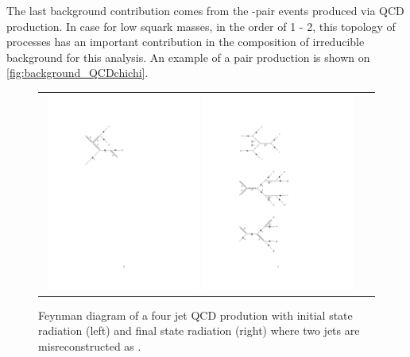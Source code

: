 The last background contribution comes from the \charginopm -\neutralinotwo pair events produced via QCD production. In case for low squark masses, in the order of 1 - 2\tev, this topology of processes has an important contribution in the composition of irreducible background for this analysis. An example of a \neutralinotwo pair production is shown on \autoref{fig:background_QCDchichi}.

\begin{figure}[tbh!]
	\centering
	\begin{tabular}{cc}
		\includegraphics[width=0.48\textwidth]{diagrams/pics/background_QCDinitrad.pdf}
		\includegraphics[width=0.48\textwidth]{diagrams/pics/background_QCDfinrad.pdf}
	\end{tabular}
	\caption{Feynman diagram of a four jet QCD prodution with initial state radiation (left) and final state radiation (right) where two jets are misreconstructed as \hadtau. }
	\label{fig:background_QCDinitrad}
\end{figure}


